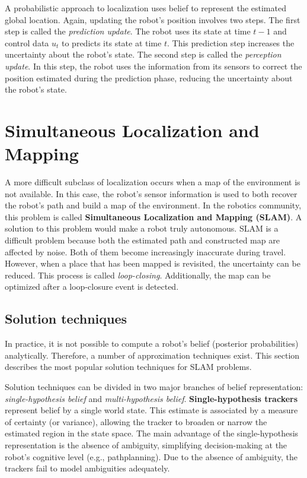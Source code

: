 A probabilistic approach to localization uses belief to represent the estimated global location.
Again, updating the robot's position involves two steps.
The first step is called the \textit{prediction update}.
The robot uses its state at time $t - 1$ and control data $u_t$ to predicts its state at time $t$.
This prediction step increases the uncertainty about the robot's state.
The second step is called the \textit{perception update}.  
In this step, the robot uses the information from its sensors to correct the position estimated during the prediction phase, reducing the uncertainty about the robot's state.

\section{Simultaneous Localization and Mapping}
\label{sec:probabilistic-robotics-slam}

A more difficult subclass of localization occurs when a map of the environment is not available.
In this case, the robot's sensor information is used to both recover the robot's path and build a map of the environment.
In the robotics community, this problem is called \textbf{Simultaneous Localization and Mapping (SLAM)}.
A solution to this problem would make a robot truly autonomous.
SLAM is a difficult problem because both the estimated path and constructed map are affected by noise.
Both of them become increasingly inaccurate during travel.
However, when a place that has been mapped is revisited, the uncertainty can be reduced.
This process is called \textit{loop-closing}.
Additionally, the map can be optimized after a loop-closure event is detected.


\subsection{Solution techniques}
\label{sec:background-solution-techniques}
In practice, it is not possible to compute a robot's belief (posterior probabilities) analytically.
Therefore, a number of approximation techniques exist. 
This section describes the most popular solution techniques for SLAM problems.

Solution techniques can be divided in two major branches of belief representation: \textit{single-hypothesis belief} and \textit{multi-hypothesis belief}.
\textbf{Single-hypothesis trackers} represent belief by a single world state.
This estimate is associated by a measure of certainty (or variance), allowing the tracker to broaden or narrow the estimated region in the state space.
The main advantage of the single-hypothesis representation is the absence of ambiguity, simplifying decision-making at the robot's cognitive level (e.g., pathplanning).
Due to the absence of ambiguity, the trackers fail to model ambiguities adequately.

